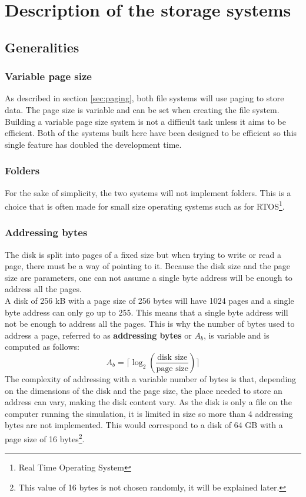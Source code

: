 \documentclass[10pt,a4paper]{ULBreport}
\begin{document}
\chapter{Description of the storage systems}

\section{Generalities}
\subsection{Variable page size}
As described in section \ref{sec:paging}, both file systems will use paging to store data. The page size is variable and can be set when creating the file system. Building a variable page size system is not a difficult task unless it aims to be efficient. Both of the systems built here have been designed to be efficient so this single feature has doubled the development time.
\subsection{Folders}
For the sake of simplicity, the two systems will not implement folders. This is a choice that is often made for small size operating systems such as for RTOS\footnote{Real Time Operating System}.
\subsection{Addressing bytes}
The disk is split into pages of a fixed size but when trying to write or read a page, there must be a way of pointing to it. Because the disk size and the page size are parameters, one can not assume a single byte address will be enough to address all the pages. \\
A disk of 256 kB with a page size of 256 bytes will have 1024 pages and a single byte address can only go up to 255. This means that a single byte address will not be enough to address all the pages. This is why the number of bytes used to address a page, referred to as \textbf{addressing bytes} or $A_b$, is variable and is computed as follows:
\begin{equation*}
    A_b = \lceil \log_2\left(\frac{\text{disk size}}{\text{page size}}\right) \rceil
\end{equation*}
The complexity of addressing with a variable number of bytes is that, depending on the dimensions of the disk and the page size, the place needed to store an address can vary, making the disk content vary. As the disk is only a file on the computer running the simulation, it is limited in size so more than 4 addressing bytes are not implemented. This would correspond to a disk of 64 GB with a page size of 16 bytes\footnote{This value of 16 bytes is not chosen randomly, it will be explained later.}.
\end{document}
